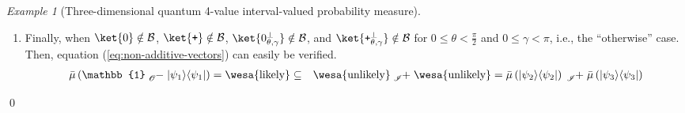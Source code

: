 \documentclass{article}
\theoremstyle{remark}
\newtheorem{example}{Example}
\newcommand{\proj}[1]{|#1 \rangle\langle #1 |}
\newcommand{\ps}{\texttt{+}}
\newcommand{\likely}{{\mbox{\wesa{likely}}}}
\newcommand{\unlikely}{{\mbox{\wesa{unlikely}}}}
\newcommand{\rme}{\mathrm{e}}
\newcommand{\rmi}{\mathrm{i}}
\begin{document}
\begin{example}[Three-dimensional quantum 4-value interval-valued
probability measure]
\begin{enumerate}
\[\begin{pmatrix}
\cos\left(\frac{\pi}{2}-\theta\right)
\end{pmatrix}=\rme^{-\rmi\gamma}\ket{\ps_{\frac{\pi}{2}-\theta,\pi+\gamma}^{\perp}}
\]
Because of $0\le\theta<\frac{\pi}{2}$ and $0\le\gamma<\pi$, we have
($0<\theta'=\frac{\pi}{2}-\theta<\frac{\pi}{2}$ and $\pi\le\gamma'=\pi+\gamma<2\pi$)
or $\theta'=\frac{\pi}{2}-\theta=\frac{\pi}{2}$. Similarly, when
$\ket{\psi_{1}}$ is $\ket{\ps_{\theta,\gamma}^{\perp}}$ and $\ket{\ps}\notin\mathcal{B}$,
equation (\ref{eq:non-additive-vectors}) holds. 
\item Finally, when $\ket{0}\notin\mathcal{B}$, $\ket{\ps}\notin\mathcal{B}$,
$\ket{0_{\theta,\gamma}^{\perp}}\notin\mathcal{B}$, and $\ket{\ps_{\theta,\gamma}^{\perp}}\notin\mathcal{B}$
for $0\le\theta<\frac{\pi}{2}$ and $0\le\gamma<\pi$, i.e., the ``otherwise''
case. Then, equation (\ref{eq:non-additive-vectors}) can easily be
verified. 
\begin{eqnarray*}
\bar{\mu}\left(\mathbb{1}\tensor*[_{\mathscr{O}}]{-}{}\proj{\psi_{1}}\right)=\likely & \subseteq & \unlikely\tensor*[_{\mathscr{I}}]{+}{}\unlikely=\bar{\mu}\left(\proj{\psi_{2}}\right)\tensor*[_{\mathscr{I}}]{+}{}\bar{\mu}\left(\proj{\psi_{3}}\right)
\end{eqnarray*}
\end{enumerate}
\qed\end{example}


\begin{comment}


\end{comment}

\printbibliography
\end{document}
